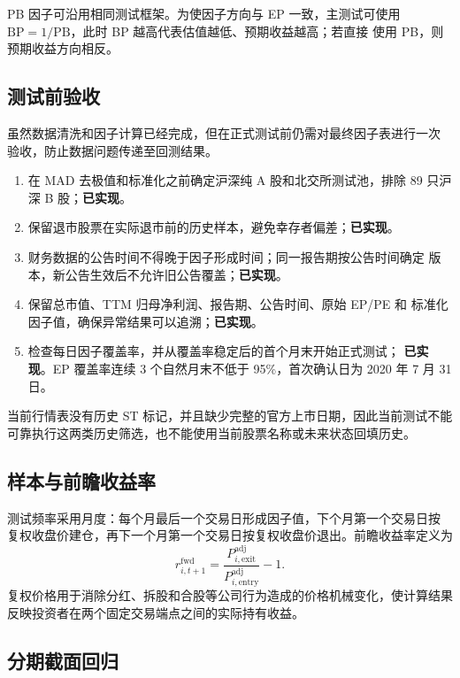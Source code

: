 \documentclass[UTF8,a4paper,11pt]{ctexart}
\begin{document}
PB 因子可沿用相同测试框架。为使因子方向与 EP 一致，主测试可使用
$\mathrm{BP}=1/\mathrm{PB}$，此时 BP 越高代表估值越低、预期收益越高；若直接
使用 PB，则预期收益方向相反。

\subsection{测试前验收}

虽然数据清洗和因子计算已经完成，但在正式测试前仍需对最终因子表进行一次
验收，防止数据问题传递至回测结果。

\begin{enumerate}[leftmargin=2.7em]
  \item 在 MAD 去极值和标准化之前确定沪深纯 A 股和北交所测试池，排除
        89 只沪深 B 股；\textbf{已实现}。
  \item 保留退市股票在实际退市前的历史样本，避免幸存者偏差；\textbf{已实现}。
  \item 财务数据的公告时间不得晚于因子形成时间；同一报告期按公告时间确定
        版本，新公告生效后不允许旧公告覆盖；\textbf{已实现}。
  \item 保留总市值、TTM 归母净利润、报告期、公告时间、原始 EP/PE 和
        标准化因子值，确保异常结果可以追溯；\textbf{已实现}。
  \item 检查每日因子覆盖率，并从覆盖率稳定后的首个月末开始正式测试；
        \textbf{已实现}。EP 覆盖率连续 3 个自然月末不低于 95\%，首次确认日为
        2020 年 7 月 31 日。
\end{enumerate}

当前行情表没有历史 ST 标记，并且缺少完整的官方上市日期，因此当前测试不能
可靠执行这两类历史筛选，也不能使用当前股票名称或未来状态回填历史。

\subsection{样本与前瞻收益率}

测试频率采用月度：每个月最后一个交易日形成因子值，下个月第一个交易日按
复权收盘价建仓，再下一个月第一个交易日按复权收盘价退出。前瞻收益率定义为
\begin{equation}
  r^{\mathrm{fwd}}_{i,t+1}
  =\frac{P^{\mathrm{adj}}_{i,\mathrm{exit}}}
  {P^{\mathrm{adj}}_{i,\mathrm{entry}}}-1.
\end{equation}
复权价格用于消除分红、拆股和合股等公司行为造成的价格机械变化，使计算结果
反映投资者在两个固定交易端点之间的实际持有收益。

\subsection{分期截面回归}
\end{document}
